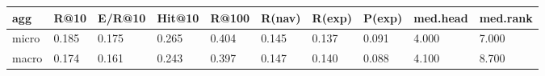 \begin{tabular}{llllllllll}
\toprule
agg & R@10 & E/R@10 & Hit@10 & R@100 & R(nav) & R(exp) & P(exp) & med.head & med.rank \\
\midrule
micro & 0.185 & 0.175 & 0.265 & 0.404 & 0.145 & 0.137 & 0.091 & 4.000 & 7.000 \\
macro & 0.174 & 0.161 & 0.243 & 0.397 & 0.147 & 0.140 & 0.088 & 4.100 & 8.700 \\
\bottomrule
\end{tabular}
